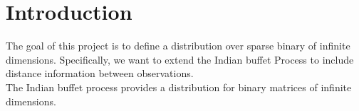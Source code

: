 \chapter{Introduction} %

The goal of this project is to define a distribution over sparse binary of
infinite dimensions. Specifically, we want to extend the Indian buffet Process
to include distance information between observations. \\

\noindent
The Indian buffet process provides a distribution for binary matrices of infinite
dimensions. 


